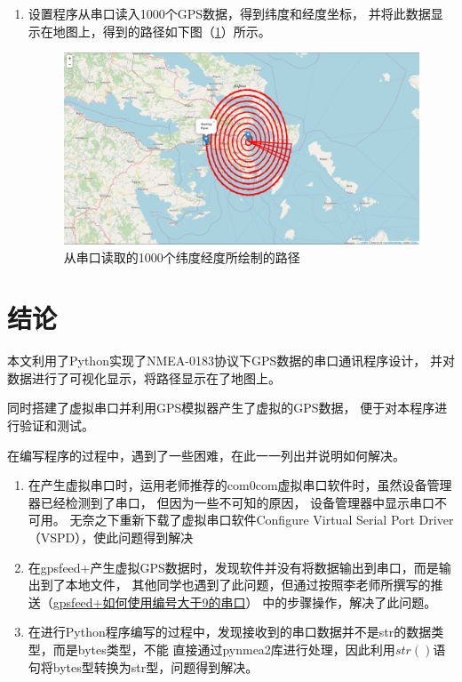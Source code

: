 \documentclass[UTF-8, a4paper, 12pt]{ctexart}
\begin{document}
\begin{enumerate}
\item 设置程序从串口读入1000个GPS数据，得到纬度和经度坐标，
并将此数据显示在地图上，得到的路径如下图（\ref{f11}）所示。
\begin{figure}[htbp]
    \centering
    \includegraphics[width=15cm]{figs/f13.png}
    \caption{从串口读取的1000个纬度经度所绘制的路径}
    \label{f11}
\end{figure}
\end{enumerate}




\section{结论}

本文利用了Python实现了NMEA-0183协议下GPS数据的串口通讯程序设计，
并对数据进行了可视化显示，将路径显示在了地图上。

同时搭建了虚拟串口并利用GPS模拟器产生了虚拟的GPS数据，
便于对本程序进行验证和测试。

在编写程序的过程中，遇到了一些困难，在此一一列出并说明如何解决。
\begin{enumerate}
    \item 在产生虚拟串口时，运用老师推荐的com0com虚拟串口软件时，虽然设备管理器已经检测到了串口，
    但因为一些不可知的原因，
    设备管理器中显示串口不可用。
    无奈之下重新下载了虚拟串口软件Configure Virtual Serial Port Driver（VSPD），使此问题得到解决
    \item 在gpsfeed+产生虚拟GPS数据时，发现软件并没有将数据输出到串口，而是输出到了本地文件，
    其他同学也遇到了此问题，但通过按照李老师所撰写的推送（\href{https://mp.weixin.qq.com/s/sCODhan6wwRr1mklzY9Uqw}{gpsfeed+如何使用编号大于9的串口}）
    中的步骤操作，解决了此问题。
    \item 在进行Python程序编写的过程中，发现接收到的串口数据并不是str的数据类型，而是bytes类型，不能
    直接通过pynmea2库进行处理，因此利用$str()$语句将bytes型转换为str型，问题得到解决。
\end{enumerate}
\end{document}
